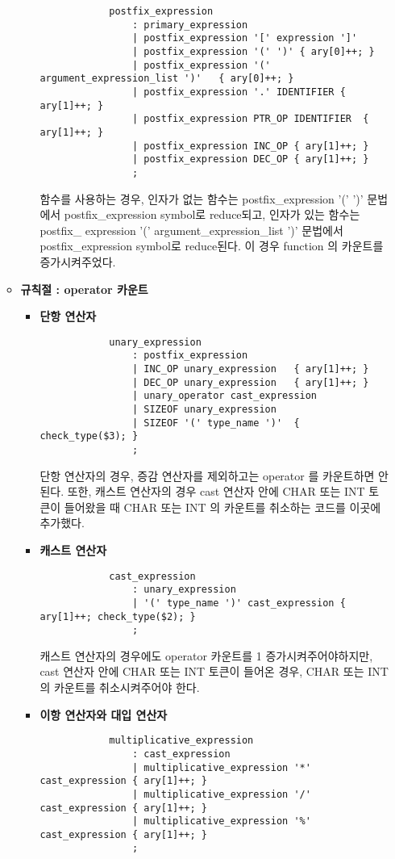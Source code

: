 \documentclass{article}
\begin{document}
\begin{itemize}
\begin{itemize}
\begin{itemize}
\begin{lstlisting}
			postfix_expression
				: primary_expression
				| postfix_expression '[' expression ']'
				| postfix_expression '(' ')' { ary[0]++; }
				| postfix_expression '(' argument_expression_list ')'	{ ary[0]++; }
				| postfix_expression '.' IDENTIFIER	{ ary[1]++; }
				| postfix_expression PTR_OP IDENTIFIER	{ ary[1]++; }
				| postfix_expression INC_OP	{ ary[1]++; }
				| postfix_expression DEC_OP	{ ary[1]++; }
				;
			\end{lstlisting}
			함수를 사용하는 경우, 인자가 없는 함수는 postfix\_expression '(' ')' 문법에서 postfix\_expression
			symbol로 reduce되고, 인자가 있는 함수는 postfix\_ expression '(' argument\_expression\_list ')'
			문법에서 postfix\_expression symbol로 reduce된다. 이 경우 function 의 카운트를 증가시켜주었다.
		\end{itemize}

		\item {\bf 규칙절 : operator 카운트}
		\begin{itemize}
			\item {\bf 단항 연산자}
			\begin{lstlisting}
			unary_expression
				: postfix_expression
				| INC_OP unary_expression	{ ary[1]++; }
				| DEC_OP unary_expression	{ ary[1]++; }
				| unary_operator cast_expression
				| SIZEOF unary_expression
				| SIZEOF '(' type_name ')'	{ check_type($3); }
				;
			\end{lstlisting} 
			단항 연산자의 경우, 증감 연산자를 제외하고는 operator 를 카운트하면 안된다.
			또한, 캐스트 연산자의 경우 cast 연산자 안에 CHAR 또는 INT 토큰이 들어왔을 때
			CHAR 또는 INT 의 카운트를 취소하는 코드를 이곳에 추가했다.

			\item {\bf 캐스트 연산자}
			\begin{lstlisting}
			cast_expression
				: unary_expression
				| '(' type_name ')' cast_expression	{ ary[1]++; check_type($2); }
				;
			\end{lstlisting}
			캐스트 연산자의 경우에도 operator 카운트를 1 증가시켜주어야하지만, cast 연산자 안에
			CHAR 또는 INT 토큰이 들어온 경우, CHAR 또는 INT 의 카운트를 취소시켜주어야 한다.
			
			\item {\bf 이항 연산자와 대입 연산자}
			\begin{lstlisting}
			multiplicative_expression
				: cast_expression
				| multiplicative_expression '*' cast_expression	{ ary[1]++; }
				| multiplicative_expression '/' cast_expression	{ ary[1]++; }
				| multiplicative_expression '%' cast_expression	{ ary[1]++; }
				;


\end{lstlisting}
\end{itemize}
\end{itemize}
\end{itemize}
\end{document}
